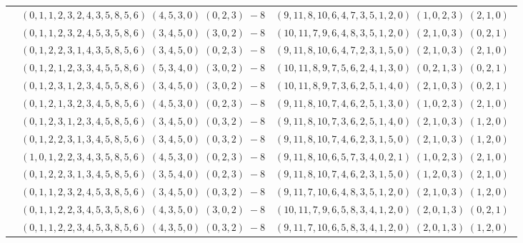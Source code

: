\documentclass[11pt]{article}
\begin{document}
\begin{longtable}[l]{|c|c|c|}
 \cline{2-3} 
 & $(0 ,1 ,1 ,2 ,3 ,2 ,4 ,3 ,5 ,8 ,5 ,6) \;(4 ,5 ,3 ,0) \;(0 ,2 ,3) \;-8$ & $(9 ,11 ,8 ,10 ,6 ,4 ,7 ,3 ,5 ,1 ,2 ,0) \;(1 ,0 ,2 ,3) \;(2 ,1 ,0) \;$\\ 
 \cline{2-3} 
 & $(0 ,1 ,1 ,2 ,3 ,2 ,4 ,5 ,3 ,5 ,8 ,6) \;(3 ,4 ,5 ,0) \;(3 ,0 ,2) \;-8$ & $(10 ,11 ,7 ,9 ,6 ,4 ,8 ,3 ,5 ,1 ,2 ,0) \;(2 ,1 ,0 ,3) \;(0 ,2 ,1) \;$\\ 
 \cline{2-3} 
 & $(0 ,1 ,2 ,2 ,3 ,1 ,4 ,3 ,5 ,8 ,5 ,6) \;(3 ,4 ,5 ,0) \;(0 ,2 ,3) \;-8$ & $(9 ,11 ,8 ,10 ,6 ,4 ,7 ,2 ,3 ,1 ,5 ,0) \;(2 ,1 ,0 ,3) \;(2 ,1 ,0) \;$\\ 
 \cline{2-3} 
 & $(0 ,1 ,2 ,1 ,2 ,3 ,3 ,4 ,5 ,5 ,8 ,6) \;(5 ,3 ,4 ,0) \;(3 ,0 ,2) \;-8$ & $(10 ,11 ,8 ,9 ,7 ,5 ,6 ,2 ,4 ,1 ,3 ,0) \;(0 ,2 ,1 ,3) \;(0 ,2 ,1) \;$\\ 
 \cline{2-3} 
 & $(0 ,1 ,2 ,3 ,1 ,2 ,3 ,4 ,5 ,5 ,8 ,6) \;(3 ,4 ,5 ,0) \;(3 ,0 ,2) \;-8$ & $(10 ,11 ,8 ,9 ,7 ,3 ,6 ,2 ,5 ,1 ,4 ,0) \;(2 ,1 ,0 ,3) \;(0 ,2 ,1) \;$\\ 
 \cline{2-3} 
 & $(0 ,1 ,2 ,1 ,3 ,2 ,3 ,4 ,5 ,8 ,5 ,6) \;(4 ,5 ,3 ,0) \;(0 ,2 ,3) \;-8$ & $(9 ,11 ,8 ,10 ,7 ,4 ,6 ,2 ,5 ,1 ,3 ,0) \;(1 ,0 ,2 ,3) \;(2 ,1 ,0) \;$\\ 
 \cline{2-3} 
 & $(0 ,1 ,2 ,3 ,1 ,2 ,3 ,4 ,5 ,8 ,5 ,6) \;(3 ,4 ,5 ,0) \;(0 ,3 ,2) \;-8$ & $(9 ,11 ,8 ,10 ,7 ,3 ,6 ,2 ,5 ,1 ,4 ,0) \;(2 ,1 ,0 ,3) \;(1 ,2 ,0) \;$\\ 
 \cline{2-3} 
 & $(0 ,1 ,2 ,2 ,3 ,1 ,3 ,4 ,5 ,8 ,5 ,6) \;(3 ,4 ,5 ,0) \;(0 ,3 ,2) \;-8$ & $(9 ,11 ,8 ,10 ,7 ,4 ,6 ,2 ,3 ,1 ,5 ,0) \;(2 ,1 ,0 ,3) \;(1 ,2 ,0) \;$\\ 
 \cline{2-3} 
 & $(1 ,0 ,1 ,2 ,2 ,3 ,4 ,3 ,5 ,8 ,5 ,6) \;(4 ,5 ,3 ,0) \;(0 ,2 ,3) \;-8$ & $(9 ,11 ,8 ,10 ,6 ,5 ,7 ,3 ,4 ,0 ,2 ,1) \;(1 ,0 ,2 ,3) \;(2 ,1 ,0) \;$\\ 
 \cline{2-3} 
 & $(0 ,1 ,2 ,2 ,3 ,1 ,3 ,4 ,5 ,8 ,5 ,6) \;(3 ,5 ,4 ,0) \;(0 ,2 ,3) \;-8$ & $(9 ,11 ,8 ,10 ,7 ,4 ,6 ,2 ,3 ,1 ,5 ,0) \;(1 ,2 ,0 ,3) \;(2 ,1 ,0) \;$\\ 
 \cline{2-3} 
 & $(0 ,1 ,1 ,2 ,3 ,2 ,4 ,5 ,3 ,8 ,5 ,6) \;(3 ,4 ,5 ,0) \;(0 ,3 ,2) \;-8$ & $(9 ,11 ,7 ,10 ,6 ,4 ,8 ,3 ,5 ,1 ,2 ,0) \;(2 ,1 ,0 ,3) \;(1 ,2 ,0) \;$\\ 
 \cline{2-3} 
 & $(0 ,1 ,1 ,2 ,2 ,3 ,4 ,5 ,3 ,5 ,8 ,6) \;(4 ,3 ,5 ,0) \;(3 ,0 ,2) \;-8$ & $(10 ,11 ,7 ,9 ,6 ,5 ,8 ,3 ,4 ,1 ,2 ,0) \;(2 ,0 ,1 ,3) \;(0 ,2 ,1) \;$\\ 
 \cline{2-3} 
 & $(0 ,1 ,1 ,2 ,2 ,3 ,4 ,5 ,3 ,8 ,5 ,6) \;(4 ,3 ,5 ,0) \;(0 ,3 ,2) \;-8$ & $(9 ,11 ,7 ,10 ,6 ,5 ,8 ,3 ,4 ,1 ,2 ,0) \;(2 ,0 ,1 ,3) \;(1 ,2 ,0) \;$\\ 

\end{longtable}
\end{document}
